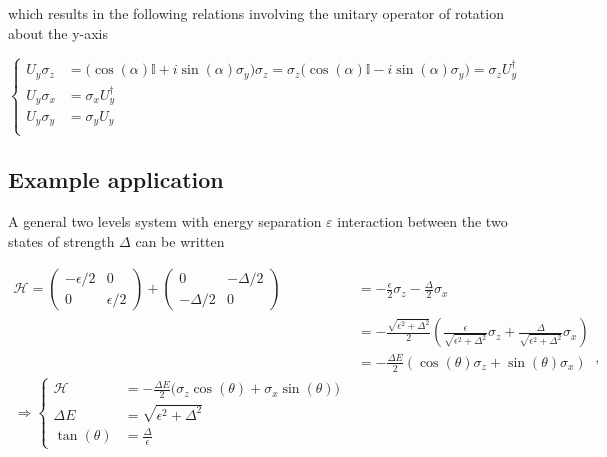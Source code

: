  \noindent  which  results  in  the following  relations  involving  the
 unitary operator of rotation about the y-axis

 \begin{equation}\label{uniComm1}
   \left\lbrace\begin{aligned}
       U_{y}\sigma_z & = \bigg(\cos(\alpha)\mathbb{I}+i\sin(\alpha)\sigma_y\bigg)\sigma_z = \sigma_z\bigg(\cos(\alpha)\mathbb{I}-i\sin(\alpha)\sigma_y\bigg) = \sigma_zU_y^{\dagger}\\
       U_{y}\sigma_x & = \sigma_xU_y^{\dagger}\\
       U_{y}\sigma_y & = \sigma_yU_y\\
     \end{aligned}\right.
 \end{equation}

 \subsection{Example application\label{subsec:ExampleApplication}}
 A general  two levels system with  energy separation $ \varepsilon  $ interaction
 between the two states of strength $ \Delta $ can be written

 \begin{equation}
   \label{l1-uni}
   \begin{aligned}
     \mathcal{H} = \left(\begin{matrix} -\epsilon/2 & 0\\ 0 & \epsilon/2
       \end{matrix}\right) + \begin{pmatrix}
       0 & -\Delta/2\\-\Delta/2 & 0
     \end{pmatrix} & = {-\frac{\epsilon}{2}\sigma_z-\frac{\Delta}{2}\sigma_x}\\
     & = -\frac{\sqrt{\epsilon^2+\Delta^2}}{2}\left(\frac{\epsilon}{\sqrt{\epsilon^2+\Delta^2}}\sigma_z+\frac{\Delta}{\sqrt{\epsilon^2+\Delta^2}}\sigma_x\right)\\
     & = -\frac{\Delta E}{2}\left(\cos\left(\theta\right)\sigma_z+\sin\left(\theta\right)\sigma_x\right)\\
     {\Rightarrow \left\lbrace\begin{aligned}
           \mathcal{H} & = -\frac{\Delta E}{2}\big(\sigma_z\cos(\theta)+\sigma_x\sin(\theta)\big)\\
           \Delta E & = \sqrt{\epsilon^2+\Delta^2}\\
           \tan(\theta) & = \frac{\Delta}{\epsilon}
         \end{aligned}\right.}
   \end{aligned},
 \end{equation}

